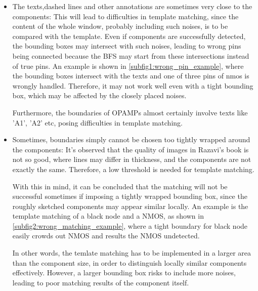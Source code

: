 \documentclass{article}
\begin{document}
\begin{itemize}
\item The texts,dashed lines and other annotations are sometimes very close to the components: 
This will lead to difficulties in template matching, since the content of the whole window, probably including such noises, is to be compared with the template.
Even if components are successfully detected, the bounding boxes may intersect with such noises, leading to wrong pins being connected because the BFS may start from these intersections instead of true pins.
An example is shown in \cref{subfig1:wrong_pin_example}, where the bounding boxes intersect with the texts and one of three pins of nmos is wrongly handled.
Therefore, it may not work well even with a tight bounding box, which may be affected by the closely placed noises.

Furthermore, the boundaries of OPAMPs almost certainly involve texts like 'A1', 'A2' etc, posing difficulties in template matching. 

\item Sometimes, boundaries simply cannot be chosen too tightly wrapped around the components:
It's observed that the quality of images in Razavi's book is not so good, 
where lines may differ in thickness, and the components are not exactly the same. 
Therefore, a low threshold is needed for template matching. 

With this in mind, it can be concluded that the matching will not be successful sometimes if imposing a tightly wrapped bounding box,
since the roughly sketched components may appear similar locally. 
An example is the template matching of a black node and a NMOS, as shown in \cref{subfig2:wrong_matching_example}, 
where a tight boundary for black node easily crowds out NMOS and results the NMOS undetected.

In other words, the temlate matching has to be implemented in a larger area than the component size, in order to distinguish locally similar components effectively.
However, a larger bounding box risks to include more noises, leading to poor matching results of the component itself. 
\end{itemize} 
\end{document}
